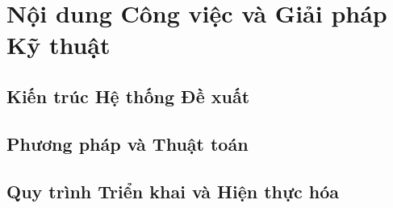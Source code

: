 \chapter{Nội dung Công việc và Giải pháp Kỹ thuật}
\label{chap:work-performed}

\section{Kiến trúc Hệ thống Đề xuất}
\label{sec:system-architecture}

\section{Phương pháp và Thuật toán}
\label{sec:methodology}

\section{Quy trình Triển khai và Hiện thực hóa}
\label{sec:implementation-process}
